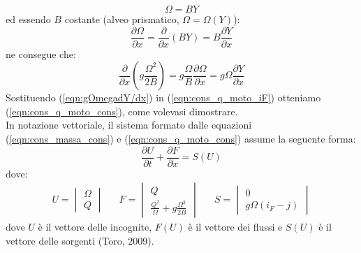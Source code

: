 \documentclass[12pt]{article} %
\begin{document}
\begin{equation}
    \Omega=B Y
    \label{eqn:Omega}
\end{equation}
\noindent ed essendo $B$ costante (alveo prismatico, $\Omega = \Omega(Y)$):
\begin{equation}
    \frac{\partial \Omega}{\partial x}=\frac{\partial }{\partial x}\left(BY\right)=B\frac{\partial Y}{\partial x}
    \label{eqn:dOmega/dx}
\end{equation}
\noindent ne consegue che:
\begin{equation}
    \frac{\partial}{\partial x}\left(g\frac{\Omega^2}{2B}\right)=g\frac{\Omega}{B}\frac{\partial \Omega}{\partial x}=g\Omega\frac{\partial Y}{\partial x}
    \label{eqn:gOmegadY/dx}
\end{equation}
\noindent Sostituendo (\ref{eqn:gOmegadY/dx}) in (\ref{eqn:cons_q_moto_iF}) otteniamo (\ref{eqn:cons_q_moto_cons}), come volevasi dimostrare.\\
\noindent In notazione vettoriale, il sistema formato dalle equazioni (\ref{eqn:cons_massa_cons}) e (\ref{eqn:cons_q_moto_cons}) assume la seguente forma:
\begin{equation}
    \frac{\partial U}{\partial t}+\frac{\partial F}{\partial x}  = S(U)
    \label{eqn:forma_cons_vett}
\end{equation}
\noindent dove:
\begin{align*}
    U=\begin{vmatrix}\Omega\\Q\end{vmatrix} &&
    F=\begin{vmatrix}Q\\\frac{Q^2}{\Omega}+g\frac{\Omega^2}{2B}\end{vmatrix} &&
    S=\begin{vmatrix}0\\g\Omega(i_F-j)\end{vmatrix}
\end{align*}
\noindent dove $U$ è il vettore delle incognite, $F(U)$ è il vettore dei flussi e $S(U)$ è il vettore delle sorgenti (Toro, 2009). 
\end{document}
